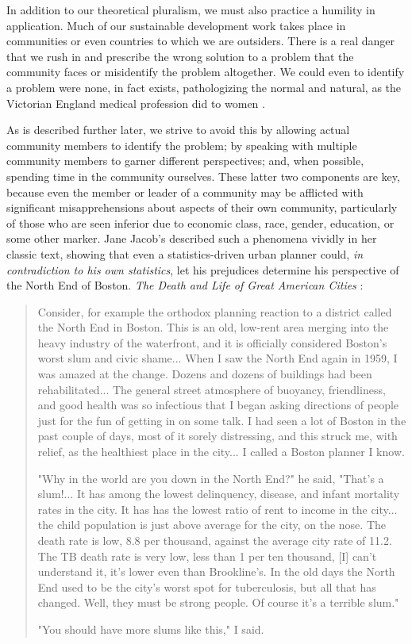 In addition to our theoretical pluralism, we must also practice a humility in application. Much of our sustainable development work takes place in communities or even countries to which we are outsiders. There is a real danger that we rush in and prescribe the wrong solution to a problem that the community faces or misidentify the problem altogether. We could even to identify a problem were none, in fact exists, pathologizing the normal and natural, as the Victorian England medical profession did to women \cite{duffinConspicuousConsumptiveWoman2012}. 

As is described further later, we strive to avoid this by allowing actual community members to identify the problem; by speaking with multiple community members to garner different perspectives; and, when possible, spending time in the community ourselves. These latter two components are key, because even the member or leader of a community may be afflicted with significant misapprehensions about aspects of their own community, particularly of those who are seen inferior due to economic class, race, gender, education, or some other marker. Jane Jacob's described such a phenomena vividly in her classic text, showing that even a statistics-driven urban planner could, \textit{in contradiction to his own statistics}, let his prejudices determine his perspective of the North End of Boston. \textit{The Death and Life of Great American Cities} \cite{jacobsDeathLifeGreat2016}:

\blockquote{Consider, for example the orthodox planning reaction to a district called the North End in Boston. This is an old, low-rent area merging into the heavy industry of the waterfront, and it is officially considered Boston's worst slum and civic shame... When I saw the North End again in 1959, I was amazed at the change. Dozens and dozens of buildings had been rehabilitated... The general street atmosphere of buoyancy, friendliness, and good health was so infectious that I began asking directions of people just for the fun of getting in on some talk. I had seen a lot of Boston in the past couple of days, most of it sorely distressing, and this struck me, with relief, as the healthiest place in the city... I called a Boston planner I know.

"Why in the world are you down in the North End?" he said, "That's a slum!... It has among the lowest delinquency, disease, and infant mortality rates in the city. It has has the lowest ratio of rent to income in the city... the child population is just above average for the city, on the nose. The death rate is low, 8.8 per thousand, against the average city rate of 11.2. The TB death rate is very low, less than 1 per ten thousand, [I] can't understand it, it's lower even than Brookline's. In the old days the North End used to be the city's worst spot for tuberculosis, but all that has changed. Well, they must be strong people. Of course it's a terrible slum."

"You should have more slums like this," I said.} 

